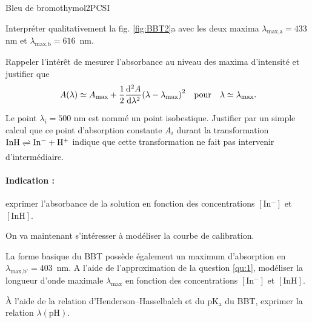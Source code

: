 \begin{exercise}{Bleu de bromothymol}{2}{PCSI}
\begin{questions}
\question Interpréter qualitativement la fig. \ref{fig:BBT2}a avec les deux maxima $\lambda_\text{max,a} = 433$ nm et {$\lambda_\text{max,b} = 616$~nm}.

\question\label{qu:1} Rappeler l'intérêt de mesurer l'absorbance au niveau des maxima d'intensité et justifier que
$$A(\lambda) \simeq A_\text{max} + \dfrac{1}{2}\dv[2]{A}{\lambda} \qty(\lambda - \lambda_\text{max})^2 \qqtext{pour} \lambda \simeq \lambda_\text{max}.$$

\question Le point $\lambda_i = 500$ nm est nommé un point isobestique. Justifier par un simple calcul que ce point d'absorption constante $A_i$ durant la transformation $\mathrm{InH \xrightleftharpoons{} In^- + H^+}$ indique que cette transformation ne fait pas intervenir d'intermédiaire. \vspace{-2em}
\begin{EnvUplevel}
\paragraph{Indication :} exprimer l'absorbance de la solution en fonction des concentrations $[\mathrm{In^-}]$ et $[\mathrm{InH}]$.

On va maintenant s'intéresser à modéliser la courbe de calibration.
\end{EnvUplevel}

\question La forme basique du BBT possède également un maximum d'absorption en $\lambda_\text{max,b'} = 403$~nm. A l'aide de l'approximation de la question \ref{qu:1}, modéliser la longueur d'onde maximale $\lambda_\text{max}$ en fonction des concentrations $[\mathrm{In^-}]$ et $[\mathrm{InH}]$.
\end{questions}

\plusloin
\`A l'aide de la relation d'Henderson--Hasselbalch et du $\mathrm{pK_a}$ du BBT, exprimer la relation $\lambda(\text{pH})$. 
\end{exercise}